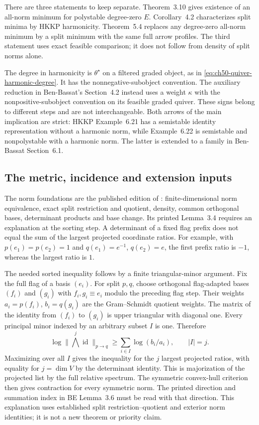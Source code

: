 There are three statements to keep separate. Theorem~3.10 gives
existence of an all-norm minimum for polystable degree-zero $E$.
Corollary~4.2 characterizes split minima by HKKP harmonicity.
Theorem~5.4 replaces any degree-zero all-norm minimum by a split
minimum with the same full arrow profiles. The third statement
uses exact feasible comparison; it does not follow from density
of split norms alone.

The degree in harmonicity is $\theta^\star$ on a filtered graded
object, as in \eqref{eq:ch50-quiver-harmonic-degree}. It has the
nonnegative-subobject convention. The auxiliary reduction in
Ben-Bassat's Section~4.2 instead uses a weight $\kappa$ with the
nonpositive-subobject convention on its feasible graded quiver.
These signs belong to different steps and are not interchangeable.
Both arrows of the main implication are strict: HKKP Example~6.21
has a semistable identity representation without a harmonic norm,
while Example~6.22 is semistable and nonpolystable with a harmonic
norm. The latter is extended to a family in Ben-Bassat Section~6.1.

\subsection{The metric, incidence and extension inputs}

The norm foundations are the published edition of \cite{BE21}:
finite-dimensional norm equivalence, exact split restriction and
quotient, density, common orthogonal bases, determinant products
and base change. Its printed Lemma~3.4 requires an explanation
at the sorting step. A determinant of a fixed flag prefix does
not equal the sum of the largest projected coordinate ratios.
For example, with $p(e_1)=p(e_2)=1$ and
$q(e_1)=e^{-1}$, $q(e_2)=e$, the first prefix ratio is $-1$,
whereas the largest ratio is $1$.

The needed sorted inequality follows by a finite triangular-minor
argument. Fix the full flag of a basis $(e_i)$. For split $p,q$,
choose orthogonal flag-adapted bases $(f_i)$ and $(g_i)$ with
$f_i,g_i\equiv e_i$ modulo the preceding flag step. Their weights
$a_i=p(f_i)$, $b_i=q(g_i)$ are the Gram--Schmidt quotient weights.
The matrix of the identity from $(f_i)$ to $(g_i)$ is upper
triangular with diagonal one. Every principal minor indexed by
an arbitrary subset $I$ is one. Therefore
\[
 \log\|\textstyle\bigwedge^j\operatorname{id}\|_{p\to q}
       \geq\sum_{i\in I}\log(b_i/a_i),\qquad |I|=j.
\]
Maximizing over all $I$ gives the inequality for the $j$ largest
projected ratios, with equality for $j=\dim V$ by the determinant
identity. This is majorization of the projected list by the full
relative spectrum. The symmetric convex-hull criterion then
gives contraction for every symmetric norm. The printed direction
and summation index in BE Lemma~3.6 must be read with that direction.
This explanation uses established split restriction--quotient and
exterior norm identities; it is not a new theorem or priority claim.

